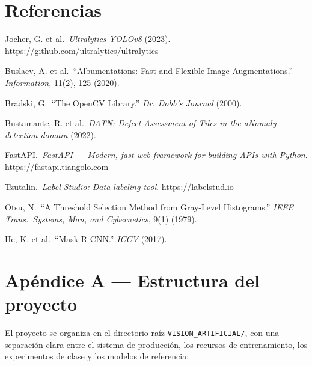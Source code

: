 \documentclass[12pt,a4paper]{article}
\begin{document}
\section*{Referencias}

\begin{enumerate}[label={[\arabic*]}]
  \item Jocher, G. et al.\ \textit{Ultralytics YOLOv8} (2023).
        \url{https://github.com/ultralytics/ultralytics}
  \item Buslaev, A. et al.\ ``Albumentations: Fast and Flexible Image Augmentations.''
        \textit{Information}, 11(2), 125 (2020).
  \item Bradski, G.\ ``The OpenCV Library.'' \textit{Dr. Dobb's Journal} (2000).
  \item Bustamante, R. et al.\ \textit{DATN: Defect Assessment of Tiles in the
        aNomaly detection domain} (2022).
  \item FastAPI.\ \textit{FastAPI — Modern, fast web framework for building APIs
        with Python}. \url{https://fastapi.tiangolo.com}
  \item Tzutalin.\ \textit{Label Studio: Data labeling tool}.
        \url{https://labelstud.io}
  \item Otsu, N.\ ``A Threshold Selection Method from Gray-Level Histograms.''
        \textit{IEEE Trans.\ Systems, Man, and Cybernetics}, 9(1) (1979).
  \item He, K. et al.\ ``Mask R-CNN.'' \textit{ICCV} (2017).
\end{enumerate}

\appendix
\section*{Apéndice A — Estructura del proyecto}

El proyecto se organiza en el directorio raíz \texttt{VISION\_ARTIFICIAL/},
con una separación clara entre el sistema de producción, los recursos de entrenamiento,
los experimentos de clase y los modelos de referencia:
\end{document}
